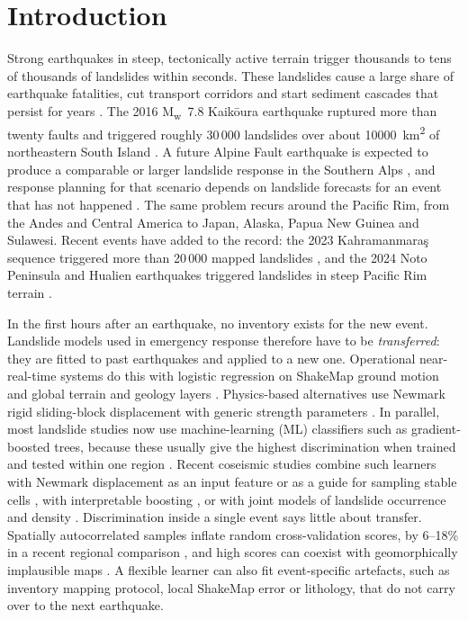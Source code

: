 \section{Introduction}\label{sec:intro}

Strong earthquakes in steep, tectonically active terrain trigger thousands to tens of thousands of landslides within seconds. These landslides cause a large share of earthquake fatalities, cut transport corridors and start sediment cascades that persist for years \citep{keefer1984,fan2019}. The 2016 M\textsubscript{w}~7.8 Kaik\={o}ura earthquake ruptured more than twenty faults \citep{hamling2017} and triggered roughly 30\,000 landslides over about \SI{10000}{\square\kilo\metre} of northeastern South Island \citep{massey2018,massey2020update}. A future Alpine Fault earthquake is expected to produce a comparable or larger landslide response in the Southern Alps \citep{robinson2016}, and response planning for that scenario depends on landslide forecasts for an event that has not happened \citep{orchiston2018}. The same problem recurs around the Pacific Rim, from the Andes and Central America to Japan, Alaska, Papua New Guinea and Sulawesi. Recent events have added to the record: the 2023 Kahramanmara\c{s} sequence triggered more than 20\,000 mapped landslides \citep{yilmaz2026kahramanmaras}, and the 2024 Noto Peninsula and Hualien earthquakes triggered landslides in steep Pacific Rim terrain \citep{loi2024noto,zhang2025noto,chang2024hualien,chen2025hualien}.

In the first hours after an earthquake, no inventory exists for the new event. Landslide models used in emergency response therefore have to be \emph{transferred}: they are fitted to past earthquakes and applied to a new one. Operational near-real-time systems do this with logistic regression on ShakeMap ground motion and global terrain and geology layers \citep{nowicki2014,nowickijessee2018,allstadt2022}. Physics-based alternatives use Newmark rigid sliding-block displacement with generic strength parameters \citep{newmark1965,jibson2000,jibson2007}. In parallel, most landslide studies now use machine-learning (ML) classifiers such as gradient-boosted trees, because these usually give the highest discrimination when trained and tested within one region \citep{merghadi2020,reichenbach2018}. Recent coseismic studies combine such learners with Newmark displacement as an input feature or as a guide for sampling stable cells \citep{zhang2025newmarkxgboost,liu2025newmarkcnn}, with interpretable boosting \citep{chen2026ebm}, or with joint models of landslide occurrence and density \citep{dahal2024spacetime}. Discrimination inside a single event says little about transfer. Spatially autocorrelated samples inflate random cross-validation scores, by 6--18\% in a recent regional comparison \citep{brenning2012,roberts2017,kumar2025crossvalidation}, and high scores can coexist with geomorphically implausible maps \citep{steger2016}. A flexible learner can also fit event-specific artefacts, such as inventory mapping protocol, local ShakeMap error or lithology, that do not carry over to the next earthquake.

